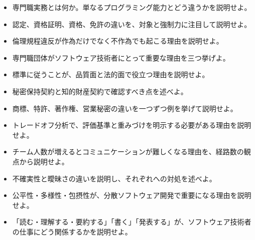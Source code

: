 \documentclass[uplatex,dvipdfmx,a4paper,11pt]{jsarticle}
\begin{document}

\begin{itemize}[leftmargin=2em]

\item 専門職実務とは何か。単なるプログラミング能力とどう違うかを説明せよ。

\item 認定、資格証明、資格、免許の違いを、対象と強制力に注目して説明せよ。

\item 倫理規程違反が作為だけでなく不作為でも起こる理由を説明せよ。

\item 専門職団体がソフトウェア技術者にとって重要な理由を三つ挙げよ。

\item 標準に従うことが、品質面と法的面で役立つ理由を説明せよ。

\item 秘密保持契約と知的財産契約で確認すべき点を述べよ。

\item 商標、特許、著作権、営業秘密の違いを一つずつ例を挙げて説明せよ。

\item トレードオフ分析で、評価基準と重みづけを明示する必要がある理由を説明せよ。

\item チーム人数が増えるとコミュニケーションが難しくなる理由を、経路数の観点から説明せよ。

\item 不確実性と曖昧さの違いを説明し、それぞれへの対処を述べよ。

\item 公平性・多様性・包摂性が、分散ソフトウェア開発で重要になる理由を説明せよ。

\item 「読む・理解する・要約する」「書く」「発表する」が、ソフトウェア技術者の仕事にどう関係するかを説明せよ。

\end{itemize}

\begin{center}
\end{center}
\end{document}
